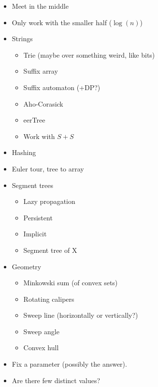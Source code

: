 \documentclass[11.5pt,a4paper,landscape,oneside]{amsart}
\newenvironment{myitemize}
{ \begin{itemize}[leftmargin=.5cm]
    \setlength{\itemsep}{0pt}
    \setlength{\parskip}{0pt}
    \setlength{\parsep}{0pt}     }
{ \end{itemize}                  }
\begin{document}
\begin{multicols*}{2}
\begin{myitemize}
\begin{itemize}
                    \end{itemize}
                \item Meet in the middle
                \item Only work with the smaller half ($\log(n)$)
                \item Strings
                    \begin{itemize}
                        \item Trie (maybe over something weird, like bits)
                        \item Suffix array
                        \item Suffix automaton (+DP?)
                        \item Aho-Corasick
                        \item eerTree
                        \item Work with $S+S$
                    \end{itemize}
                \item Hashing
                \item Euler tour, tree to array
                \item Segment trees
                    \begin{itemize}
                        \item Lazy propagation
                        \item Persistent
                        \item Implicit
                        \item Segment tree of X
                    \end{itemize}
                \item Geometry
                    \begin{itemize}
                        \item Minkowski sum (of convex sets)
                        \item Rotating calipers
                        \item Sweep line (horizontally or vertically?)
                        \item Sweep angle
                        \item Convex hull
                    \end{itemize}
                \item Fix a parameter (possibly the answer).
                \item Are there few distinct values?

\end{myitemize}
\end{multicols*}
\end{document}
